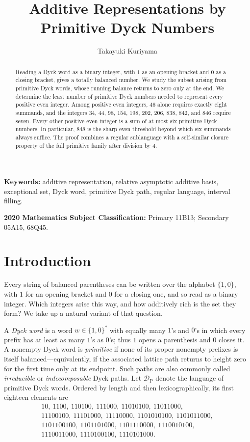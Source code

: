 \documentclass[12pt]{article}
\title{Additive Representations by Primitive Dyck Numbers}
\author{Takayuki Kuriyama}
\date{}
\theoremstyle{plain}
\newcommand{\DP}{\mathcal{D}_{\mathrm{P}}}
\begin{document}
\maketitle

\begin{abstract}
Reading a Dyck word as a binary integer, with $1$ as an opening bracket
and $0$ as a closing bracket, gives a totally balanced number.  We study
the subset arising from primitive Dyck words, whose running balance
returns to zero only at the end.  We determine the least number of
primitive Dyck numbers needed to represent every positive even integer.
Among positive even integers, $46$ alone requires exactly eight summands,
and the integers
$34$, $44$, $98$, $154$, $198$, $202$, $206$, $838$, $842$, and $846$
require seven.  Every other positive even integer is a sum of at most
six primitive Dyck numbers.  In particular, $848$ is the sharp even threshold
beyond which six summands always suffice.  The proof combines a regular
sublanguage with a self-similar closure property of the full primitive
family after division by $4$.
\end{abstract}

\noindent\textbf{Keywords:} additive representation, relative asymptotic
additive basis, exceptional set, Dyck word, primitive Dyck path, regular
language, interval filling.

\noindent\textbf{2020 Mathematics Subject Classification:} Primary 11B13;
Secondary 05A15, 68Q45.

\section{Introduction}\label{sec:introduction}

Every string of balanced parentheses can be written over the alphabet
$\{1,0\}$, with $1$ for an opening bracket and $0$ for a closing one,
and so read as a binary integer.  Which integers arise this way, and how
additively rich is the set they form?  We take up a natural variant of
that question.

A \emph{Dyck word} is a word $w\in\{1,0\}^*$ with equally many $1$'s
and $0$'s in which every prefix has at least as many $1$'s as $0$'s;
thus $1$ opens a parenthesis and $0$ closes it.  A nonempty Dyck word is
\emph{primitive} if none of its proper nonempty prefixes is itself
balanced---equivalently, if the associated lattice path returns to
height zero for the first time only at its endpoint.  Such paths are
also commonly called \emph{irreducible} or \emph{indecomposable} Dyck
paths.  Let $\DP$ denote the language
of primitive Dyck words.  Ordered by length and then lexicographically,
its first eighteen elements are
\[
\begin{gathered}
10,\ 1100,\ 110100,\ 111000,\ 11010100,\ 11011000,\\
11100100,\ 11101000,\ 11110000,\ 1101010100,\ 1101011000,\\
1101100100,\ 1101101000,\ 1101110000,\ 1110010100,\\
1110011000,\ 1110100100,\ 1110101000.
\end{gathered}
\]
\end{document}
